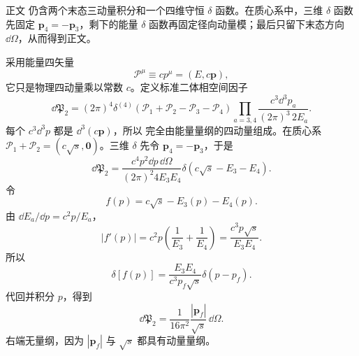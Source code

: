 \begin{derivation}
正文 仍含两个末态三动量积分和一个四维守恒 $\delta$ 函数。在质心系中，三维 $\delta$ 函数先固定 $\mathbf p_4=-\mathbf p_3$，剩下的能量 $\delta$ 函数再固定径向动量模；最后只留下末态方向 $\dd\Omega$，从而得到正文。

采用能量四矢量
\begin{equation*}
 \mathcal P^\mu\equiv cp^\mu=(E,c\mathbf p),
 \end{equation*}
它只是物理四动量乘以常数 $c$。定义标准二体相空间因子
\begin{equation*}
 \dd\mathfrak P_2
 =(2\pi)^4\delta^{(4)}(\mathcal P_1+\mathcal P_2-\mathcal P_3-\mathcal P_4)
 \prod_{a=3,4}\frac{c^3\dd^3 p_a}{(2\pi)^3\,2E_a}.
 \end{equation*}
每个 $c^3\dd^3 p$ 都是 $\dd^3(c\mathbf p)$，所以  完全由能量量纲的四动量组成。在质心系 $\mathcal P_1+\mathcal P_2=(c\sqrt s,\mathbf0)$。三维 $\delta$ 先令 $\mathbf p_4=-\mathbf p_3$，于是
\begin{equation*}
 \dd\mathfrak P_2
 =\frac{c^4p^2\dd p\,\dd\Omega}{(2\pi)^2 4E_3E_4}
 \delta(c\sqrt s-E_3-E_4).
\end{equation*}
令
\begin{equation*}
 f(p)=c\sqrt s-E_3(p)-E_4(p).
\end{equation*}
由 $\dd E_a/\dd p=c^2p/E_a$，
\begin{equation*}
 \left|f'(p)\right|
 =c^2p\left(\frac1{E_3}+\frac1{E_4}\right)
 =\frac{c^3p\sqrt s}{E_3E_4}.
\end{equation*}
所以
\begin{equation*}
 \delta[f(p)]
 =\frac{E_3E_4}{c^3p_f\sqrt s}\delta(p-p_f).
\end{equation*}
代回并积分 $p$，得到
\begin{equation*}
 {
 \dd\mathfrak P_2
 =\frac1{16\pi^2}\frac{|\mathbf p_f|}{\sqrt s}\,\dd\Omega.}
 \end{equation*}
右端无量纲，因为 $|\mathbf p_f|$ 与 $\sqrt s$ 都具有动量量纲。
\end{derivation}

